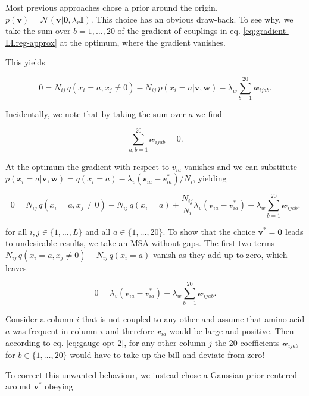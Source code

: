 \documentclass[12pt,a4paper,twoside]{book}
\newcommand{\eq}{\!=\!}
\newcommand{\Gauss}{\mathcal{N}}
\newcommand{\I}{\mathbf{I}}
\renewcommand{\v}{\mathbf{v}}
\newcommand{\via}{\mathcal{v}_{ia}}
\newcommand{\w}{\mathbf{w}}
\newcommand{\wijab}{\mathcal{w}_{ijab}}
\theoremstyle{definition}
\theoremstyle{definition}
\theoremstyle{remark}
\begin{document}
Most previous approaches chose a prior around the origin,
\(p(\v) = \Gauss ( \v| \mathbf{0}, \lambda_v \I)\). This choice has an
obvious draw-back. To see why, we take the sum over \(b=1,\ldots, 20\)
of the gradient of couplings in eq. \eqref{eq:gradient-LLreg-approx} at
the optimum, where the gradient vanishes.

This yields

\begin{equation}
    0 =   N_{ij}\, q(x_i \eq a, x_j \ne 0)   - N_{ij}\, p(x_i \eq a | \v, \w)  - \lambda_w \sum_{b=1}^{20} \wijab.
\end{equation}

Incidentally, we note that by taking the sum over \(a\) we find

\begin{equation}
    \sum_{a,b=1}^{20} \wijab  = 0.
\label{eq:zero-sum-wij}
\end{equation}

At the optimum the gradient with respect to \(v_{ia}\) vanishes and we
can substitute
\(p(x_i=a|\v,\w) = q(x_i=a) - \lambda_v (\via - \via^*) / N_i\),
yielding

\begin{equation}
    0 =  N_{ij} \, q(x_i \eq a, x_j \ne 0)  - N_{ij} \, q(x_i=a) + \frac{N_{ij}}{N_i}\lambda_v (\via - \via^*)  - \lambda_w \sum_{b=1}^{20} \wijab .
\label{eq:gauge-opt-1}
\end{equation}

for all \(i,j \in \{1,\ldots,L\}\) and all \(a \in \{1,\ldots,20\}\). To
show that the choice \(\v^*= \mathbf{0}\) leads to undesirable results,
we take an \protect\hyperlink{abbrev}{MSA} without gaps. The first two
terms \(N_{ij} \, q(x_i \eq a, x_j \ne 0) - N_{ij} \, q(x_i=a)\) vanish
as they add up to zero, which leaves

\begin{equation}
    0 =  \lambda_v (\via - \via^*)  - \lambda_w \sum_{b=1}^{20} \wijab .
\label{eq:gauge-opt-2}
\end{equation}

Consider a column \(i\) that is not coupled to any other and assume that
amino acid \(a\) was frequent in column \(i\) and therefore \(\via\)
would be large and positive. Then according to eq. \eqref{eq:gauge-opt-2},
for any other column \(j\) the 20 coefficients \(\wijab\) for
\(b \in \{1,\ldots,20\}\) would have to take up the bill and deviate
from zero!

To correct this unwanted behaviour, we instead chose a Gaussian prior
centered around \(\v^*\) obeying
\end{document}
